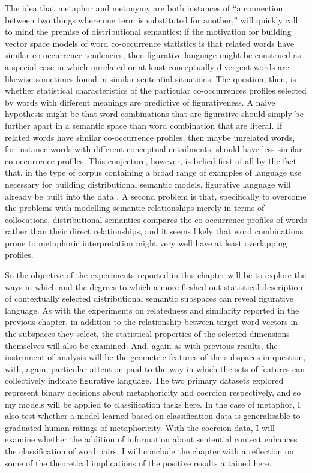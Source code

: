 The idea that metaphor and metonymy are both instances of ``a connection between two things where one term is substituted for another,'' \citep[][p. 260]{Gibbs1993} will quickly call to mind the premise of distributional semantics: if the motivation for building vector space models of word co-occurrence statistics is that related words have similar co-occurrence tendencies, then figurative language might be construed as a special case in which unrelated or at least conceptually divergent words are likewise sometimes found in similar sentential situations.  The question, then, is whether statistical characteristics of the particular co-occurrences profiles selected by words with different meanings are predictive of figurativeness.  A naive hypothesis might be that word combinations that are figurative should simply be further apart in a semantic space than word combination that are literal.  If related words have similar co-occurrence profiles, then maybe unrelated words, for instance words with different conceptual entailments, should have less similar co-occurrence profiles.  This conjecture, however, is belied first of all by the fact that, in the type of corpus containing a broad range of examples of language use necessary for building distributional semantic models, figurative language will already be built into the data \citep[and, as][has pointed out, figurative language is going to built into any sample of language no matter how small or basic]{Gibbs1994}.  A second problem is that, specifically to overcome the problems with modelling semantic relationships merely in terms of collocations, distributional semantics compares the co-occurrence profiles of words rather than their direct relationships, and it seems likely that word combinations prone to metaphoric interpretation might very well have at least overlapping profiles.

So the objective of the experiments reported in this chapter will be to explore the ways in which and the degrees to which a more fleshed out statistical description of contextually selected distributional semantic subspaces can reveal figurative language.  As with the experiments on relatedness and similarity reported in the previous chapter, in addition to the relationship between target word-vectors in the subspaces they select, the statistical properties of the selected dimensions themselves will also be examined.  And, again as with previous results, the instrument of analysis will be the geometric features of the subspaces in question, with, again, particular attention paid to the way in which the sets of features can collectively indicate figurative language.  The two primary datasets explored represent binary decisions about metaphoricity and coercion respectively, and so my models will be applied to classification tasks here.  In the case of metaphor, I also test whether a model learned based on classification data is generalisable to graduated human ratings of metaphoricity.  With the coercion data, I will examine whether the addition of information about sentential context enhances the classification of word pairs.  I will conclude the chapter with a reflection on some of the theoretical implications of the positive results attained here.


